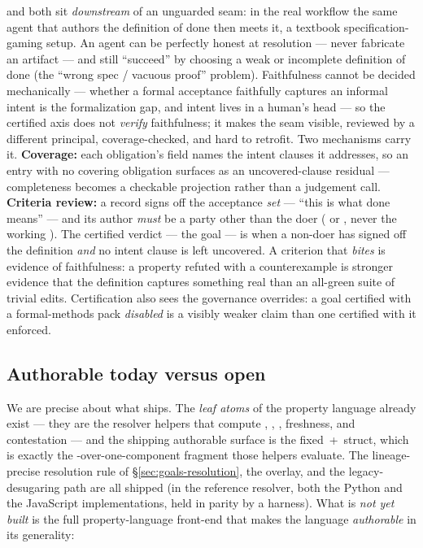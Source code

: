  and  both sit \emph{downstream} of an unguarded seam: in the real workflow
the same agent that authors the definition of done then meets it, a textbook specification-gaming
setup. An agent can be perfectly honest at resolution --- never fabricate an artifact --- and still
``succeed'' by choosing a weak or incomplete definition of done (the ``wrong spec / vacuous proof''
problem). Faithfulness cannot be decided mechanically --- whether a formal acceptance faithfully
captures an informal intent is the formalization gap, and intent lives in a human's head --- so the
certified axis does not \emph{verify} faithfulness; it makes the seam visible, reviewed by a different
principal, coverage-checked, and hard to retrofit. Two mechanisms carry it. \textbf{Coverage:} each
obligation's  field names the intent clauses it addresses, so an 
entry with no covering obligation surfaces as an uncovered-clause residual --- completeness becomes a
checkable projection rather than a judgement call. \textbf{Criteria review:} a 
record signs off the acceptance \emph{set} --- ``this is what done means'' --- and its author
\emph{must} be a party other than the doer ( or , never the working
). The certified verdict ---  the goal --- is  when a
non-doer has signed off the definition \emph{and} no intent clause is left uncovered. A criterion that
\emph{bites} is evidence of faithfulness: a property refuted with a counterexample is stronger evidence
that the definition captures something real than an all-green suite of trivial edits. Certification also
sees the governance overrides: a goal certified with a formal-methods pack \emph{disabled} is a visibly
weaker claim than one certified with it enforced.

\subsection{Authorable today versus open}\label{sec:goals-status}

We are precise about what ships. The \emph{leaf atoms} of the property language already exist --- they
are the resolver helpers that compute , , , freshness, and
contestation --- and the shipping authorable surface is the fixed \,+\,
struct, which is exactly the -over-one-component fragment those helpers evaluate. The
lineage-precise resolution rule of \S\ref{sec:goals-resolution}, the  overlay, and the
legacy-desugaring path are all shipped (in the reference resolver, both the Python and the JavaScript
implementations, held in parity by a harness). What is \emph{not yet built} is the full property-language
front-end that makes the language \emph{authorable} in its generality:

